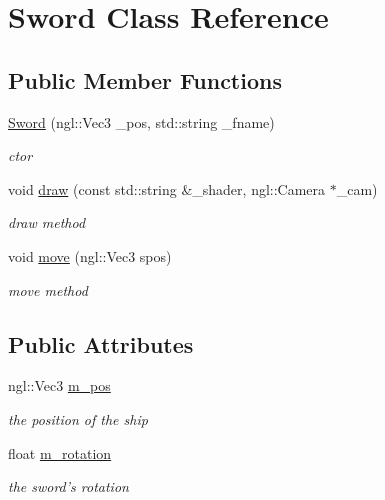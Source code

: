 \hypertarget{class_sword}{\section{Sword Class Reference}
\label{class_sword}
}
\subsection*{Public Member Functions}
\begin{DoxyCompactItemize}
\item 
\hyperlink{class_sword_af691a6e171248ecddf4a789b34babb2e}{Sword} (ngl\-::\-Vec3 \-\_\-pos, std\-::string \-\_\-fname)
\begin{DoxyCompactList}\small\item\em ctor \end{DoxyCompactList}\item 
void \hyperlink{class_sword_afc2461586ea51d11fa6efaccdaf988fe}{draw} (const std\-::string \&\-\_\-shader, ngl\-::\-Camera $\ast$\-\_\-cam)
\begin{DoxyCompactList}\small\item\em draw method \end{DoxyCompactList}\item 
void \hyperlink{class_sword_aae6a84368d81a6d20beb946ee7b403a8}{move} (ngl\-::\-Vec3 spos)
\begin{DoxyCompactList}\small\item\em move method \end{DoxyCompactList}\end{DoxyCompactItemize}
\subsection*{Public Attributes}
\begin{DoxyCompactItemize}
\item 
\hypertarget{class_sword_aee9c64dbc2060e74b35d8919ce5161f7}{ngl\-::\-Vec3 \hyperlink{class_sword_aee9c64dbc2060e74b35d8919ce5161f7}{m\-\_\-pos}}\label{class_sword_aee9c64dbc2060e74b35d8919ce5161f7}

\begin{DoxyCompactList}\small\item\em the position of the ship \end{DoxyCompactList}\item 
\hypertarget{class_sword_a6cb5db3d2d4927b0e0d3ad5ebc07606a}{float \hyperlink{class_sword_a6cb5db3d2d4927b0e0d3ad5ebc07606a}{m\-\_\-rotation}}\label{class_sword_a6cb5db3d2d4927b0e0d3ad5ebc07606a}

\begin{DoxyCompactList}\small\item\em the sword's rotation \end{DoxyCompactList}\end{DoxyCompactItemize}


